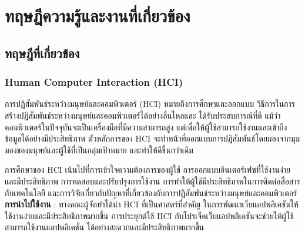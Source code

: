 \chapter{ทฤษฎีความรู้และงานที่เกี่ยวข้อง}



\section{ทฤษฎีที่เกี่ยวข้อง}
\subsection{Human Computer Interaction (HCI)}
การปฏิสัมพันธ์ระหว่างมนุษย์และคอมพิวเตอร์ (HCI) หมายถึงการศึกษาและออกแบบ
วิธีการในการสร้างปฏิสัมพันธ์ระหว่างมนุษย์และคอมพิวเตอร์ได้อย่างลื่นไหลและ
ได้รับประสบการณ์ที่ดี แม้ว่าคอมพิวเตอร์ในปัจจุบันจะเป็นเครื่องมือที่มีความสามารถสูง
แต่เพื่อให้ผู้ใช้สามารถใช้งานและเข้าถึงข้อมูลได้อย่างมีประสิทธิภาพ ตัวหลักการของ HCI
จะทำหน้าที่ออกแบบการปฏิสัมพันธ์โดยมองจากมุมมองของมนุษย์และผู้ใช้ที่เป็นกลุ่มเป้าหมาย
และทำให้ดีขึ้นกว่าเดิม
\par การศึกษาของ HCI เน้นไปที่การเข้าใจความต้องการของผู้ใช้
การออกแบบอินเตอร์เฟซที่ใช้งานง่ายและมีประสิทธิภาพ การทดสอบและปรับปรุงการใช้งาน
การทำให้ผู้ใช้มีประสิทธิภาพในการติดต่อสื่อสารกับเทคโนโลยี
และการวิจัยเกี่ยวกับปัญหาที่เกี่ยวข้องกับการปฏิสัมพันธ์ระหว่างมนุษย์และคอมพิวเตอร์ \\
\textbf{การนำไปใช้งาน} : ทางคณะผู้จัดทำได้นำ HCI ที่เป็นศาสตร์ที่สำคัญ
ในการพัฒนาเว็บแอปพลิเคชันให้ใช้งานง่ายและมีประสิทธิภาพมากขึ้น
การประยุกต์ใช้ HCI กับโปรเจ็คเว็บแอปพลิเคชันจะช่วยให้ผู้ใช้สามารถใช้งานแอปพลิเคชั่น
ได้อย่างสะดวกและมีประสิทธิภาพมากขึ้น
